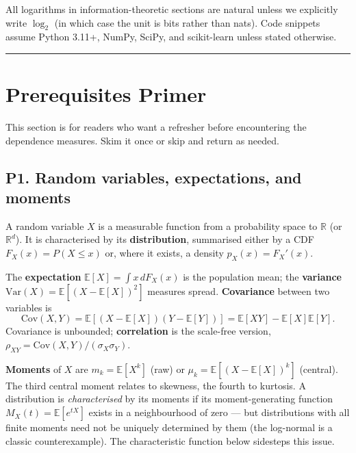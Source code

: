 \documentclass{article}
\let\oldsection\section
\renewcommand{\section}{\clearpage\oldsection}
\begin{document}
All logarithms in information-theoretic sections are natural unless we
explicitly write \(\log_2\) (in which case the unit is bits rather than
nats). Code snippets assume Python 3.11+, NumPy, SciPy, and scikit-learn
unless stated otherwise.

\begin{center}\rule{0.5\linewidth}{0.5pt}\end{center}

\section{Prerequisites Primer}\label{prerequisites-primer}

This section is for readers who want a refresher before encountering the
dependence measures. Skim it once or skip and return as needed.

\subsection{P1. Random variables, expectations, and
moments}\label{p1-random-variables-expectations-and-moments}

A random variable \(X\) is a measurable function from a probability
space to \(\mathbb{R}\) (or \(\mathbb{R}^d\)). It is characterised by
its \textbf{distribution}, summarised either by a CDF
\(F_X(x) = P(X \leq x)\) or, where it exists, a density
\(p_X(x) = F_X'(x)\).

The \textbf{expectation} \(\mathbb{E}[X] = \int x \, dF_X(x)\) is the
population mean; the \textbf{variance}
\(\mathrm{Var}(X) = \mathbb{E}[(X - \mathbb{E}[X])^2]\) measures spread.
\textbf{Covariance} between two variables is \[
\mathrm{Cov}(X, Y) = \mathbb{E}[(X - \mathbb{E}[X])(Y - \mathbb{E}[Y])] = \mathbb{E}[XY] - \mathbb{E}[X]\mathbb{E}[Y].
\] Covariance is unbounded; \textbf{correlation} is the scale-free
version, \(\rho_{XY} = \mathrm{Cov}(X, Y) / (\sigma_X \sigma_Y)\).

\textbf{Moments} of \(X\) are \(m_k = \mathbb{E}[X^k]\) (raw) or
\(\mu_k = \mathbb{E}[(X - \mathbb{E}[X])^k]\) (central). The third
central moment relates to skewness, the fourth to kurtosis. A
distribution is \emph{characterised} by its moments if its
moment-generating function \(M_X(t) = \mathbb{E}[e^{tX}]\) exists in a
neighbourhood of zero --- but distributions with all finite moments need
not be uniquely determined by them (the log-normal is a classic
counterexample). The characteristic function below sidesteps this issue.
\end{document}
